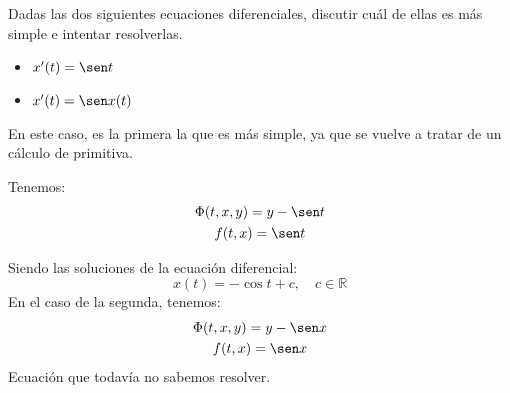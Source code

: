 \begin{ejemplo}
    Dadas las dos siguientes ecuaciones diferenciales, discutir cuál de ellas es más simple e intentar resolverlas.
    \begin{itemize}
        \item $x'(t) = \sen t$
        \item $x'(t) = \sen x(t)$
    \end{itemize}
    En este caso, es la primera la que es más simple, ya que se vuelve a tratar de un cálculo de primitiva.

    Tenemos:
    \begin{gather*}
        \Phi(t,x,y) = y-\sen t \\
        f(t,x) = \sen t
    \end{gather*}

    Siendo las soluciones de la ecuación diferencial:
    \begin{equation*}
        x(t) = -\cos t + c, \quad c \in \mathbb{R}
    \end{equation*}
    En el caso de la segunda, tenemos:
    \begin{gather*}
        \Phi(t,x,y) = y-\sen x \\
        f(t,x) = \sen x
    \end{gather*}
    Ecuación que todavía no sabemos resolver.
\end{ejemplo}
